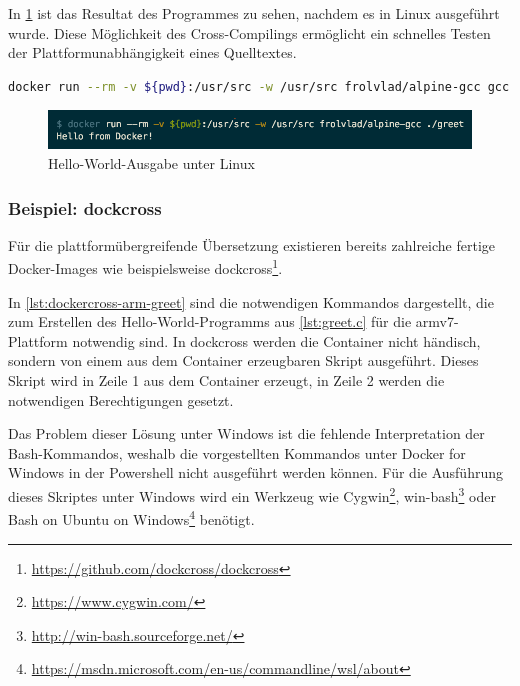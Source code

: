 In \cref{fig:greet-output} ist das Resultat des Programmes zu sehen, nachdem es in Linux ausgeführt wurde.
Diese Möglichkeit des Cross-Compilings ermöglicht ein schnelles Testen der Plattformunabhängigkeit eines Quelltextes.



\begin{lstlisting}[caption=Docker-Kommando zum Übersetzen eines C-Programmes mit gcc, language=bash, label=lst:docker-run-gcc]
docker run --rm -v ${pwd}:/usr/src -w /usr/src frolvlad/alpine-gcc gcc -o greet greet.c
\end{lstlisting}

\begin{figure}[htbp]
    \centering
    \includegraphics[width=0.8\linewidth,clip]{images/greet-output}
    \caption{Hello-World-Ausgabe unter Linux}
\label{fig:greet-output}
\end{figure}

\subsubsection{Beispiel: dockcross}
Für die plattformübergreifende Übersetzung existieren bereits zahlreiche fertige Docker-Images wie beispielsweise dockcross\footnote{\url{https://github.com/dockcross/dockcross}}.

In \cref{lst:dockercross-arm-greet} sind die notwendigen Kommandos dargestellt, die zum Erstellen des Hello-World-Programms aus \cref{lst:greet.c} für die armv7-Plattform notwendig sind.
In dockcross werden die Container nicht händisch, sondern von einem aus dem Container erzeugbaren Skript ausgeführt.
Dieses Skript wird in Zeile 1 aus dem Container erzeugt, in Zeile 2 werden die notwendigen Berechtigungen gesetzt.

Das Problem dieser Lösung unter Windows ist die fehlende Interpretation der Bash-Kommandos, weshalb die vorgestellten Kommandos unter Docker for Windows in der Powershell nicht ausgeführt werden können.
Für die Ausführung dieses Skriptes unter Windows wird ein Werkzeug wie Cygwin\footnote{\url{https://www.cygwin.com/}}, win-bash\footnote{\url{http://win-bash.sourceforge.net/}} oder Bash on Ubuntu on Windows\footnote{\url{https://msdn.microsoft.com/en-us/commandline/wsl/about}} benötigt.

